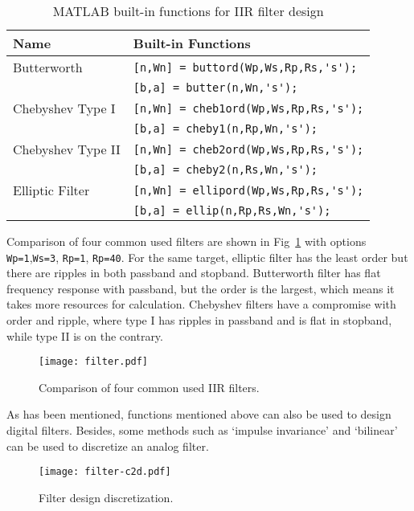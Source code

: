 \begin{table}[!htb]
    \centering
    \caption{MATLAB built-in functions for IIR filter design}
    \label{tab:filterdesign}
    \begin{tabular}{ll}
        \toprule
        Name & Built-in Functions  \\
        \midrule 
        Butterworth & \verb|[n,Wn] = buttord(Wp,Ws,Rp,Rs,'s');|        \\
                    & \verb|[b,a] = butter(n,Wn,'s');|                 \\
        Chebyshev Type I & \verb|[n,Wn] = cheb1ord(Wp,Ws,Rp,Rs,'s');|  \\
                    & \verb|[b,a] = cheby1(n,Rp,Wn,'s');|              \\
        Chebyshev Type II & \verb|[n,Wn] = cheb2ord(Wp,Ws,Rp,Rs,'s');| \\
                    & \verb|[b,a] = cheby2(n,Rs,Wn,'s');|              \\
        Elliptic Filter & \verb|[n,Wn] = ellipord(Wp,Ws,Rp,Rs,'s');|   \\
                    & \verb|[b,a] = ellip(n,Rp,Rs,Wn,'s');|            \\
        \bottomrule
    \end{tabular}
\end{table}


Comparison of four common used filters are shown in Fig~\ref{fig:filters} with options \verb|Wp=1|,\verb|Ws=3|, \verb|Rp=1|, \verb|Rp=40|. For the same target, elliptic filter has the least order but there are ripples in both passband and stopband. Butterworth filter has flat frequency response with passband, but the order is the largest, which means it takes more resources for calculation. Chebyshev filters have a compromise with order and ripple, where type I has ripples in passband and is flat in stopband, while type II is on the contrary.


\begin{figure}[!htb]
    \centering
    \texttt{[image: filter.pdf]}
    \caption{Comparison of four common used IIR filters.}
    \label{fig:filters}
\end{figure}


As has been mentioned, functions mentioned above can also be used to design digital filters. Besides, some methods such as `impulse invariance' and `bilinear' can be used to discretize an analog filter.


\begin{figure}[!htb]
    \centering
    \texttt{[image: filter-c2d.pdf]}
    \caption{Filter design discretization.}
    \label{fig:filter-c2d}
\end{figure}



